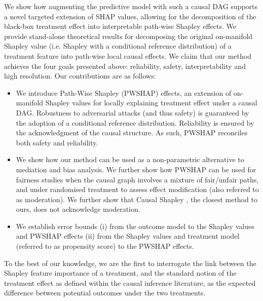 \documentclass{article}
\theoremstyle{plain}
\theoremstyle{definition}
\theoremstyle{remark}
\theoremstyle{mystyle}
\begin{document}
We show how augmenting the predictive model with such a causal DAG supports a novel targeted extension of SHAP values, allowing for the decomposition of the black-box treatment effect into interpretable path-wise Shapley effects. We provide stand-alone theoretical results for decomposing the original on-manifold Shapley value (i.e. Shapley with a conditional reference distribution) of a treatment feature into path-wise local causal effects. We claim that our method achieves the four goals presented above: reliability, safety, interpretability and high resolution. Our contributions are as follows:
\begin{itemize}[leftmargin=4mm, itemsep=2mm,topsep=0pt]
\item We introduce Path-Wise Shapley (PWSHAP) effects, an extension of on-manifold Shapley values for locally explaining treatment effect under a causal DAG. Robustness to adversarial attacks (and thus safety) is guaranteed by the adoption of a conditional reference distribution. Reliability is ensured by the acknowledgment of the causal structure. As such, PWSHAP reconciles both safety and reliability. %
\item We show how our method can be used as a non-parametric alternative to mediation and bias analysis.%
We further show how PWSHAP can be used for fairness studies when the causal graph involves a mixture of fair/unfair paths, and under randomised treatment to assess effect modification (also referred to as moderation). We further show that Causal Shapley , the closest method to ours, does not acknowledge moderation. 
\item We establish error bounds (i) from the outcome model to the Shapley values and PWSHAP effects (ii) from the Shapley values and treatment model (referred to as propensity score) to the PWSHAP effects. 
\end{itemize}
To the best of our knowledge, we are the first to interrogate the link between the Shapley feature importance of a treatment, and the standard notion of the treatment effect as defined within the causal inference literature, as the expected difference between potential outcomes under the two treatments. 
\end{document}
